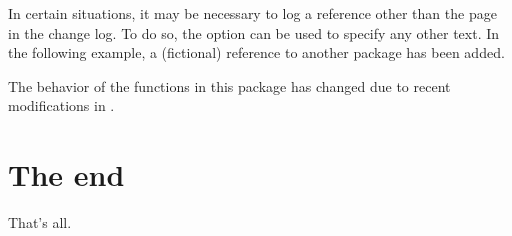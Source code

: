 \documentclass[a4paper, 11pt]{article}
\begin{document}
In certain situations, it may be necessary to log a reference other than the page in the change log. To do so, the  option can be used to specify any other text. In the following example, a (fictional) reference to another package has been added.

\begin{PDExample}
    The behavior of the functions in this package has changed due to recent modifications in .
\end{PDExample}

\section{The end}
That's all.
\end{document}
